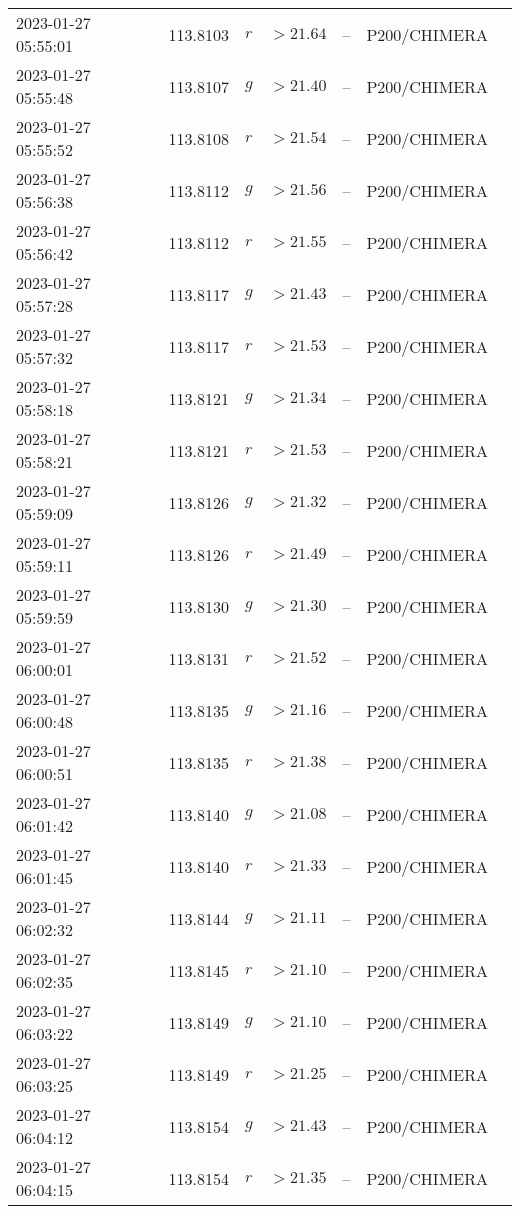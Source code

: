 \documentclass{nature_plusfigure}
\begin{document}
\begin{supplement}
\begin{center}
\begin{longtable}{lllllll}
2023-01-27 05:55:01 & 113.8103 & $r$ & $>21.64$ & -- & P200/CHIMERA &  \\ 
2023-01-27 05:55:48 & 113.8107 & $g$ & $>21.40$ & -- & P200/CHIMERA &  \\ 
2023-01-27 05:55:52 & 113.8108 & $r$ & $>21.54$ & -- & P200/CHIMERA &  \\ 
2023-01-27 05:56:38 & 113.8112 & $g$ & $>21.56$ & -- & P200/CHIMERA &  \\ 
2023-01-27 05:56:42 & 113.8112 & $r$ & $>21.55$ & -- & P200/CHIMERA &  \\ 
2023-01-27 05:57:28 & 113.8117 & $g$ & $>21.43$ & -- & P200/CHIMERA &  \\ 
2023-01-27 05:57:32 & 113.8117 & $r$ & $>21.53$ & -- & P200/CHIMERA &  \\ 
2023-01-27 05:58:18 & 113.8121 & $g$ & $>21.34$ & -- & P200/CHIMERA &  \\ 
2023-01-27 05:58:21 & 113.8121 & $r$ & $>21.53$ & -- & P200/CHIMERA &  \\ 
2023-01-27 05:59:09 & 113.8126 & $g$ & $>21.32$ & -- & P200/CHIMERA &  \\ 
2023-01-27 05:59:11 & 113.8126 & $r$ & $>21.49$ & -- & P200/CHIMERA &  \\ 
2023-01-27 05:59:59 & 113.8130 & $g$ & $>21.30$ & -- & P200/CHIMERA &  \\ 
2023-01-27 06:00:01 & 113.8131 & $r$ & $>21.52$ & -- & P200/CHIMERA &  \\ 
2023-01-27 06:00:48 & 113.8135 & $g$ & $>21.16$ & -- & P200/CHIMERA &  \\ 
2023-01-27 06:00:51 & 113.8135 & $r$ & $>21.38$ & -- & P200/CHIMERA &  \\ 
2023-01-27 06:01:42 & 113.8140 & $g$ & $>21.08$ & -- & P200/CHIMERA &  \\ 
2023-01-27 06:01:45 & 113.8140 & $r$ & $>21.33$ & -- & P200/CHIMERA &  \\ 
2023-01-27 06:02:32 & 113.8144 & $g$ & $>21.11$ & -- & P200/CHIMERA &  \\ 
2023-01-27 06:02:35 & 113.8145 & $r$ & $>21.10$ & -- & P200/CHIMERA &  \\ 
2023-01-27 06:03:22 & 113.8149 & $g$ & $>21.10$ & -- & P200/CHIMERA &  \\ 
2023-01-27 06:03:25 & 113.8149 & $r$ & $>21.25$ & -- & P200/CHIMERA &  \\ 
2023-01-27 06:04:12 & 113.8154 & $g$ & $>21.43$ & -- & P200/CHIMERA &  \\ 
2023-01-27 06:04:15 & 113.8154 & $r$ & $>21.35$ & -- & P200/CHIMERA &  \\ 

\end{longtable}
\end{center}
\end{supplement}
\end{document}
